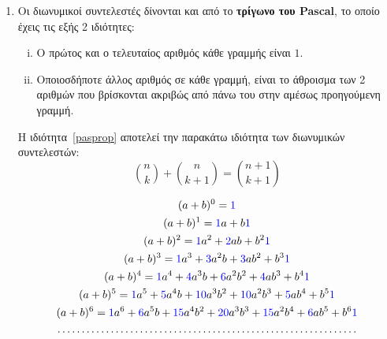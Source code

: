 \begin{enumerate}
  \item Οι διωνυμικοί συντελεστές δίνονται και από το \textbf{\color{blue} τρίγωνο του \textlatin{Pascal}}, το οποίο έχεις τις εξής 2 ιδιότητες:
  \begin{enumerate}[i)]
    \item Ο πρώτος και ο τελευταίος αριθμός κάθε γραμμής είναι $1$.
    \item\label{pasprop} Οποιοσδήποτε άλλος αριθμός σε κάθε γραμμή, είναι το άθροισμα των 2 αριθμών που βρίσκονται ακριβώς από πάνω του στην αμέσως προηγούμενη γραμμή.
  \end{enumerate}
  Η ιδιότητα~\ref{pasprop} αποτελεί την παρακάτω ιδιότητα των διωνυμικών συντελεστών:
  \[
  \binom{n}{k}+\binom{n}{k+1}=\binom{n+1}{k+1}
  \]

  \begin{gather*}
    (a+b)^{0}={\color{blue}1} \\
    (a+b)^{1}={\color{blue}1}a+b{\color{blue}1} \\
    (a+b)^{2}={\color{blue}1}a^{2}+{\color{blue}2}ab+b^{2}{\color{blue}1} \\
    (a+b)^{3}={\color{blue}1}a^{3}+{\color{blue}3}a^{2}b+{\color{blue}3}ab^{2}+b^{3}{\color{blue}1} \\
    (a+b)^{4}={\color{blue}1}a^{4}+{\color{blue}4}a^{3}b+{\color{blue}6}a^{2}b^{2}+{\color{blue}4}ab^{3}+b^{4}{\color{blue}1} \\
    (a+b)^{5}={\color{blue}1}a^{5}+{\color{blue}5}a^{4}b+{\color{blue}10}a^{3}b^{2}+{\color{blue}10}a^{2}b^{3}+{\color{blue}5}ab^{4}+b^{5}{\color{blue}1} \\
    (a+b)^{6}={\color{blue}1}a^{6}+{\color{blue}6}a^{5}b+{\color{blue}15}a^{4}b^{2}+{\color{blue}20}a^{3}b^{3}+{\color{blue}15}a^{2}b^{4}+{\color{blue}6}ab^{5}+b^{6}{\color{blue}1} \\
    \dotfill
  \end{gather*}


\end{enumerate}
